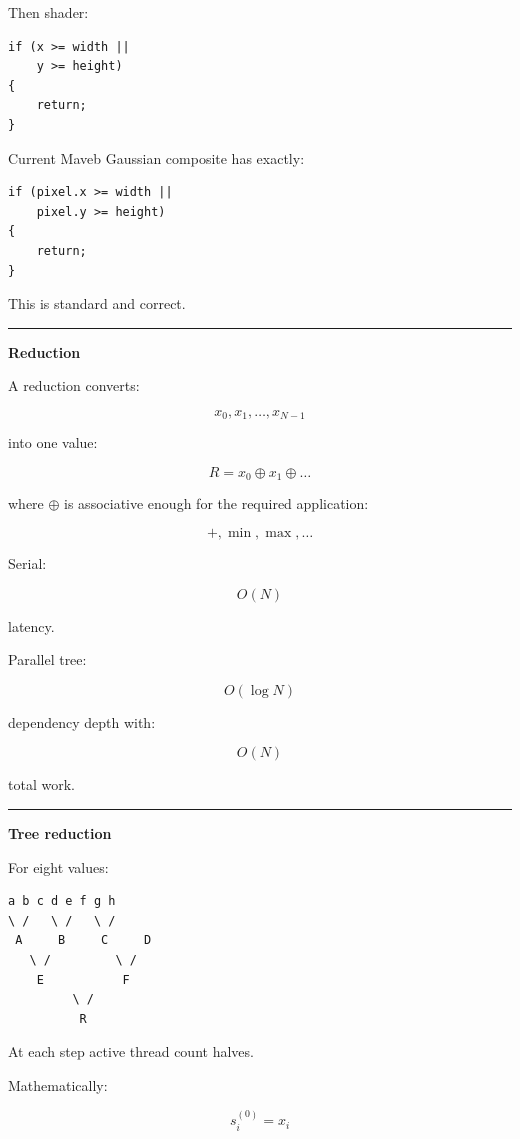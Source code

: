 Then shader:

\protect{}\label{ivlz2y}%
\begin{verbatim}
if (x >= width ||
    y >= height)
{
    return;
}
\end{verbatim}

Current Maveb Gaussian composite has exactly:

\protect{}\label{zvkv4c}%
\begin{verbatim}
if (pixel.x >= width ||
    pixel.y >= height)
{
    return;
}
\end{verbatim}

This is standard and correct.

\begin{center}\rule{0.5\linewidth}{0.5pt}\end{center}

\textbf{Reduction}

A reduction converts:

\[
x_0,x_1,\dots,x_{N-1}
\]

into one value:

\[
\boxed{
R=
x_0\oplus x_1\oplus\dots
}
\]

where \(\oplus\) is associative enough for the required application:

\[
+,\min,\max,\dots
\]

Serial:

\[
O(N)
\]

latency.

Parallel tree:

\[
O(\log N)
\]

dependency depth with:

\[
O(N)
\]

total work.

\begin{center}\rule{0.5\linewidth}{0.5pt}\end{center}

\textbf{Tree reduction}

For eight values:

\protect{}\label{uxlrwn}%
\begin{verbatim}
a b c d e f g h
\ /   \ /   \ /
 A     B     C     D
   \ /         \ /
    E           F
         \ /
          R
\end{verbatim}

At each step active thread count halves.

Mathematically:

\[
s^{(0)}_i=x_i
\]

